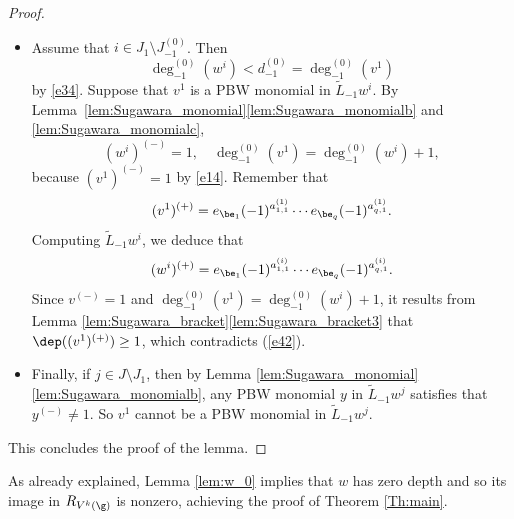 \begin{proof}
\begin{itemize}
\item
Assume that $i\in J_1\setminus J_{-1}^{(0)}$.
Then
\begin{equation}
\label{eq:d01}
\deg_{-1}^{(0)} (w^{i})< d_{-1}^{(0)} =\deg_{-1}^{(0)}(v^1)
\end{equation}
by \eqref{e34}.
Suppose that $v^1$ is a PBW monomial in ${\tilde{L}_{-1} w^{i}}$.
By Lemma~\ref{lem:Sugawara_monomial}\eqref{lem:Sugawara_monomialb} and \eqref{lem:Sugawara_monomialc},%
\begin{equation}\label{e16}
(w^{i})^{(-)}=1, \quad \deg_{-1}^{(0)}(v^1)=\deg_{-1}^{(0)}(w^i)+1,
\end{equation}
because $(v^1)^{(-)}=1$ by \eqref{e14}.
Remember that
\begin{equation}\label{e42}
(v^1)^{(+)}=e_{\be_1}(-1)^{a^{(1)}_{1,1}}\cdots e_{\be_{q}}(-1)^{a^{(1)}_{q,1}}.
\end{equation}
Computing $\tilde{L}_{-1} w^{i}$, we deduce that
\[
(w^{i})^{(+)}=e_{\be_1}(-1)^{a^{(i)}_{1,1}}\cdots e_{\be_{q}}(-1)^{a^{(i)}_{q,1}}.
\]
{Since $v^{(-)}=1$ and $\deg_{-1}^{(0)}(v^1)=\deg_{-1}^{(0)}(w^i)+1$,
it results from Lemma \ref{lem:Sugawara_bracket}\eqref{lem:Sugawara_bracket3} that $\dep((v^1)^{(+)})\geq 1$,
which contradicts (\ref{e42})}.

\item
Finally, if $j \in J \setminus J_1$, then by Lemma \ref{lem:Sugawara_monomial}\eqref{lem:Sugawara_monomialb}, any PBW monomial $y$ in $\tilde{L}_{-1}w^j$ satisfies that $y^{(-)}\neq 1$. So $v^1$
cannot be a PBW monomial in $\tilde{L}_{-1}w^j$.
\end{itemize}
This concludes the proof of the lemma.
\end{proof}

As already explained, Lemma \ref{lem:w_0} implies that $w$ has zero depth
and so its image in $R_{V^k(\g)}$ is nonzero,
achieving the proof of Theorem \ref{Th:main}.

